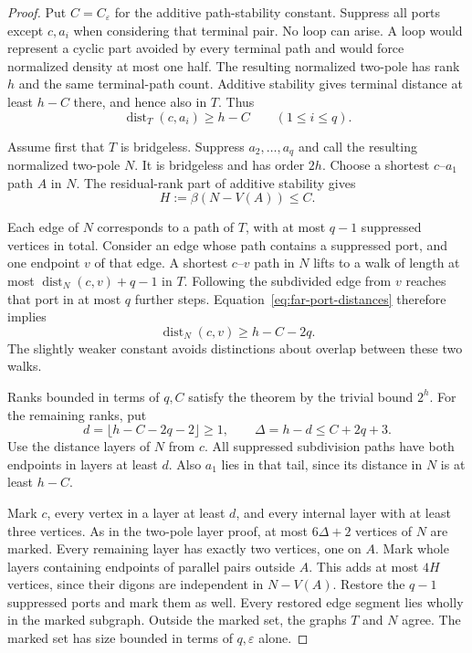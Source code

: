 \begin{proof}
Put $C=C_\varepsilon$ for the additive path-stability constant.
Suppress all ports except $c,a_i$ when considering that terminal pair.
No loop can arise.
A loop would represent a cyclic part avoided by every terminal path and would force normalized density at most one half.
The resulting normalized two-pole has rank $h$ and the same terminal-path count.
Additive stability gives terminal distance at least $h-C$ there, and hence also in $T$.
Thus
\begin{equation}\label{eq:far-port-distances}
 \operatorname{dist}_T(c,a_i)\ge h-C
 \qquad(1\le i\le q).
\end{equation}

Assume first that $T$ is bridgeless.
Suppress $a_2,\ldots,a_q$ and call the resulting normalized two-pole $N$.
It is bridgeless and has order $2h$.
Choose a shortest $c$--$a_1$ path $A$ in $N$.
The residual-rank part of additive stability gives
\[
 H:=\beta(N-V(A))\le C.
\]

Each edge of $N$ corresponds to a path of $T$, with at most $q-1$ suppressed vertices in total.
Consider an edge whose path contains a suppressed port, and one endpoint $v$ of that edge.
A shortest $c$--$v$ path in $N$ lifts to a walk of length at most
$\operatorname{dist}_N(c,v)+q-1$ in $T$.
Following the subdivided edge from $v$ reaches that port in at most $q$ further steps.
Equation~\eqref{eq:far-port-distances} therefore implies
\[
 \operatorname{dist}_N(c,v)\ge h-C-2q.
\]
The slightly weaker constant avoids distinctions about overlap between these two walks.

Ranks bounded in terms of $q,C$ satisfy the theorem by the trivial bound $2^h$.
For the remaining ranks, put
\[
 d=\lfloor h-C-2q-2\rfloor\ge1,
 \qquad \Delta=h-d\le C+2q+3.
\]
Use the distance layers of $N$ from $c$.
All suppressed subdivision paths have both endpoints in layers at least $d$.
Also $a_1$ lies in that tail, since its distance in $N$ is at least $h-C$.

Mark $c$, every vertex in a layer at least $d$, and every internal layer with at least three vertices.
As in the two-pole layer proof, at most $6\Delta+2$ vertices of $N$ are marked.
Every remaining layer has exactly two vertices, one on $A$.
Mark whole layers containing endpoints of parallel pairs outside $A$.
This adds at most $4H$ vertices, since their digons are independent in $N-V(A)$.
Restore the $q-1$ suppressed ports and mark them as well.
Every restored edge segment lies wholly in the marked subgraph.
Outside the marked set, the graphs $T$ and $N$ agree.
The marked set has size bounded in terms of $q,\varepsilon$ alone.


\end{proof}
